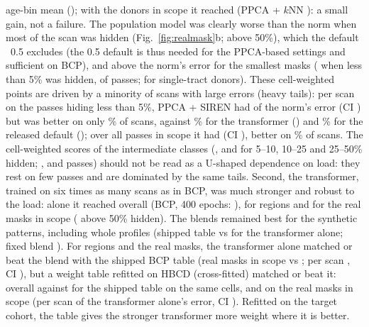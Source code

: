 \documentclass[11pt]{article}
\begin{document}
age-bin mean (\rmThreeDefAll); with the donors in scope it reached \rmThreeDefIn{} (PPCA + $k$NN \rmThreeKnnIn): a small gain,
not a failure. The population model was clearly worse than the norm when most of the scan was hidden
(Fig.~\ref{fig:realmask}b; \rmThreeShareEDef{} above 50\%), which the default ~0.5 excludes
(the 0.5 default is thus needed for the PPCA-based settings and sufficient on BCP), and above the norm's error for the
smallest masks (\rmThreeShareADef{} when less than 5\% was hidden, \rmThreeSharePassesA{} of \rmThreePasses{} passes;
\rmThreeLoadADef{} for single-tract donors). These cell-weighted points are driven by a minority of scans with large
errors (heavy tails): per scan on the passes hiding less than 5\%, PPCA + SIREN had \rmThreeScanSmallDef{} of the norm's
error (CI \rmThreeScanSmallDefCi) but was better on only \rmThreeScanSmallDefBetter\% of scans, against
\rmThreeScanSmallTfBetter\% for the transformer (\rmThreeScanSmallTf) and \rmThreeScanSmallFinalBetter\% for the
released default (\rmThreeScanSmallFinal); over all passes in scope it had \rmThreeScanInDef{} (CI \rmThreeScanInDefCi),
better on \rmThreeScanInDefBetter\% of scans. The cell-weighted scores of the intermediate classes (\rmThreeShareBDef,
\rmThreeShareCDef{} and \rmThreeShareDDef{} for 5--10, 10--25 and 25--50\% hidden; \rmThreeSharePassesB,
\rmThreeSharePassesC{} and \rmThreeSharePassesD{} passes) should not be read as a U-shaped dependence on load: they rest
on few passes and are dominated by the same tails. Second, the transformer, trained
on six times as many scans as in BCP, was much stronger and robust to the load: alone it reached \eThreeTf{} overall (BCP,
400 epochs: \rTfFour), \eThreeTfRegion{} for regions and \rmThreeTfIn{} for the real masks in scope (\rmThreeShareETf{} above
50\% hidden). The blends remained best for the synthetic patterns, including whole profiles (shipped table
\eThreeFinalWhole{} vs \eThreeTfWhole{} for the transformer alone; fixed blend \eThreeFixedWhole). For regions and the real
masks, the transformer alone matched or beat the blend with the shipped BCP table (real masks in scope \rmThreeTfIn{} vs
\rmThreeFinalIn; per scan \rmThreeTfVsFinal, CI \rmThreeTfVsFinalCi), but a weight table refitted on HBCD (cross-fitted)
matched or beat it: \eThreeRefit{} overall against \eThreeShippedDump{} for the shipped table on the same cells, and
\rmThreeRefitIn{} on the real masks in scope (per scan \rmThreeRefitVsTf{} of the transformer alone's error, CI
\rmThreeRefitVsTfCi). Refitted on the target cohort, the table gives the stronger transformer more weight where it is
better.
\end{document}
